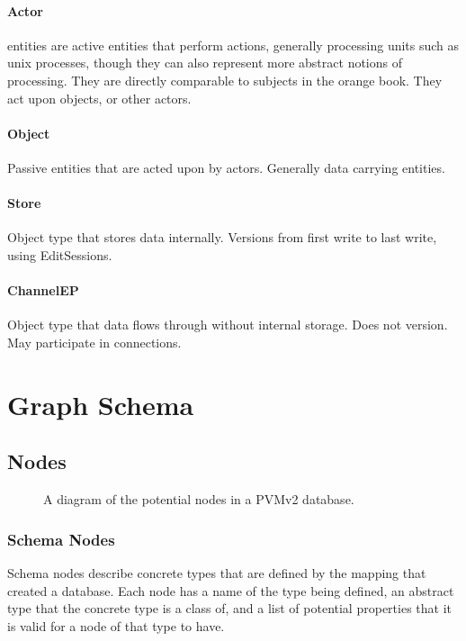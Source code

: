 \documentclass[12pt,twoside,a4paper]{article}
\begin{document}
\paragraph{Actor}
\label{sec:ty:actor}
 entities are active entities that perform actions, generally processing units such as unix processes, though they can also represent more abstract notions of processing. They are directly comparable to subjects in the orange book. They act upon objects, or other actors.

\paragraph{Object}
Passive entities that are acted upon by actors. Generally data carrying entities.

\paragraph{Store}
Object type that stores data internally. Versions from first write to last write, using EditSessions.

\paragraph{ChannelEP}
Object type that data flows through without internal storage. Does not version. May participate in connections.

\section{Graph Schema}

\subsection{Nodes}

\begin{figure}[h]
\centering

\caption{A diagram of the potential nodes in a PVMv2 database.}
\end{figure}

\subsubsection{Schema Nodes}
Schema nodes describe concrete types that are defined by the mapping that created a database. Each node has a name of the type being defined, an abstract type that the concrete type is a class of, and a list of potential properties that it is valid for a node of that type to have.
\end{document}
